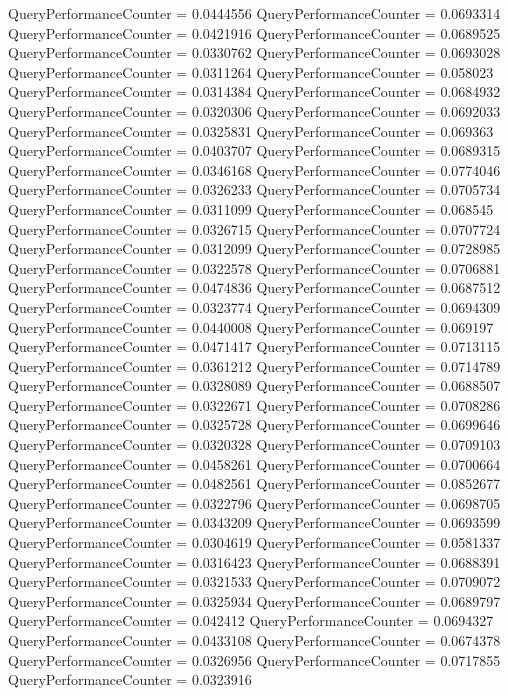 \documentclass[9pt]{article}
\theoremstyle{plain}
\theoremstyle{definition}
\theoremstyle{remark}
\numberwithin{equation}{section}
\begin{document}
QueryPerformanceCounter  =  0.0444556
QueryPerformanceCounter  =  0.0693314
QueryPerformanceCounter  =  0.0421916
QueryPerformanceCounter  =  0.0689525
QueryPerformanceCounter  =  0.0330762
QueryPerformanceCounter  =  0.0693028
QueryPerformanceCounter  =  0.0311264
QueryPerformanceCounter  =  0.058023
QueryPerformanceCounter  =  0.0314384
QueryPerformanceCounter  =  0.0684932
QueryPerformanceCounter  =  0.0320306
QueryPerformanceCounter  =  0.0692033
QueryPerformanceCounter  =  0.0325831
QueryPerformanceCounter  =  0.069363
QueryPerformanceCounter  =  0.0403707
QueryPerformanceCounter  =  0.0689315
QueryPerformanceCounter  =  0.0346168
QueryPerformanceCounter  =  0.0774046
QueryPerformanceCounter  =  0.0326233
QueryPerformanceCounter  =  0.0705734
QueryPerformanceCounter  =  0.0311099
QueryPerformanceCounter  =  0.068545
QueryPerformanceCounter  =  0.0326715
QueryPerformanceCounter  =  0.0707724
QueryPerformanceCounter  =  0.0312099
QueryPerformanceCounter  =  0.0728985
QueryPerformanceCounter  =  0.0322578
QueryPerformanceCounter  =  0.0706881
QueryPerformanceCounter  =  0.0474836
QueryPerformanceCounter  =  0.0687512
QueryPerformanceCounter  =  0.0323774
QueryPerformanceCounter  =  0.0694309
QueryPerformanceCounter  =  0.0440008
QueryPerformanceCounter  =  0.069197
QueryPerformanceCounter  =  0.0471417
QueryPerformanceCounter  =  0.0713115
QueryPerformanceCounter  =  0.0361212
QueryPerformanceCounter  =  0.0714789
QueryPerformanceCounter  =  0.0328089
QueryPerformanceCounter  =  0.0688507
QueryPerformanceCounter  =  0.0322671
QueryPerformanceCounter  =  0.0708286
QueryPerformanceCounter  =  0.0325728
QueryPerformanceCounter  =  0.0699646
QueryPerformanceCounter  =  0.0320328
QueryPerformanceCounter  =  0.0709103
QueryPerformanceCounter  =  0.0458261
QueryPerformanceCounter  =  0.0700664
QueryPerformanceCounter  =  0.0482561
QueryPerformanceCounter  =  0.0852677
QueryPerformanceCounter  =  0.0322796
QueryPerformanceCounter  =  0.0698705
QueryPerformanceCounter  =  0.0343209
QueryPerformanceCounter  =  0.0693599
QueryPerformanceCounter  =  0.0304619
QueryPerformanceCounter  =  0.0581337
QueryPerformanceCounter  =  0.0316423
QueryPerformanceCounter  =  0.0688391
QueryPerformanceCounter  =  0.0321533
QueryPerformanceCounter  =  0.0709072
QueryPerformanceCounter  =  0.0325934
QueryPerformanceCounter  =  0.0689797
QueryPerformanceCounter  =  0.042412
QueryPerformanceCounter  =  0.0694327
QueryPerformanceCounter  =  0.0433108
QueryPerformanceCounter  =  0.0674378
QueryPerformanceCounter  =  0.0326956
QueryPerformanceCounter  =  0.0717855
QueryPerformanceCounter  =  0.0323916
\end{document}
